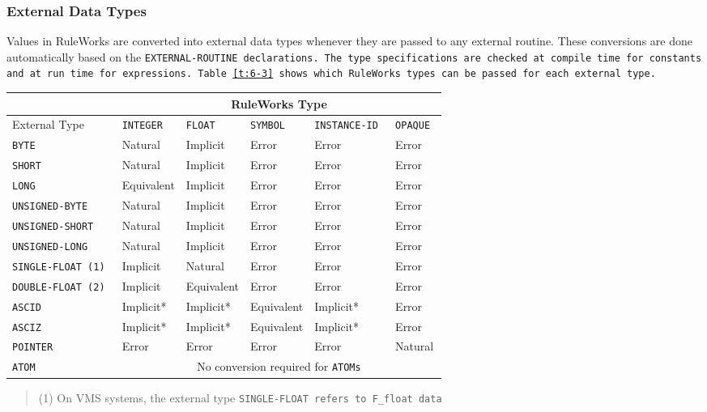 \subsubsection{External Data Types}

Values in RuleWorks are converted into external data types whenever
they are passed to any external routine. These conversions are done
automatically based on the \tt{EXTERNAL-ROUTINE} declarations. The
type specifications are checked at compile time for constants and at
run time for expressions. Table~\ref{t:6-3} shows which RuleWorks
types can be passed for each external type.

\begin{table}[h]
  \begin{tabularx}{\columnwidth}{l|lllll}
    \toprule
    & \multicolumn{5}{c}{RuleWorks Type} \\
    \midrule
    External Type   & \tt{INTEGER}    & \tt{FLOAT} & \tt{SYMBOL} & \tt{INSTANCE-ID} & \tt{OPAQUE} \\
    \midrule
    \tt{BYTE}            & Natural    & Implicit   & Error      & Error       & Error   \\
    \tt{SHORT}           & Natural    & Implicit   & Error      & Error       & Error   \\
    \tt{LONG}            & Equivalent & Implicit   & Error      & Error       & Error   \\
    \tt{UNSIGNED-BYTE}   & Natural    & Implicit   & Error      & Error       & Error   \\
    \tt{UNSIGNED-SHORT}  & Natural    & Implicit   & Error      & Error       & Error   \\
    \tt{UNSIGNED-LONG}   & Natural    & Implicit   & Error      & Error       & Error   \\
    \tt{SINGLE-FLOAT} (1) & Implicit   & Natural    & Error      & Error       & Error   \\
    \tt{DOUBLE-FLOAT} (2) & Implicit   & Equivalent & Error      & Error       & Error   \\
    \tt{ASCID}           & Implicit*  & Implicit*  & Equivalent & Implicit*   & Error   \\
    \tt{ASCIZ}           & Implicit*  & Implicit*  & Equivalent & Implicit*   & Error   \\
    \tt{POINTER}         & Error      & Error      & Error      & Error       & Natural \\
    \tt{ATOM} & \multicolumn{5}{c}{No conversion required for \tt{ATOM}s} \\
    \bottomrule
  \end{tabularx}
  \begin{quote}
    (1) On VMS systems, the external type \tt{SINGLE-FLOAT} refers to
    \verb|F_float| data


\end{quote}
\end{table}
